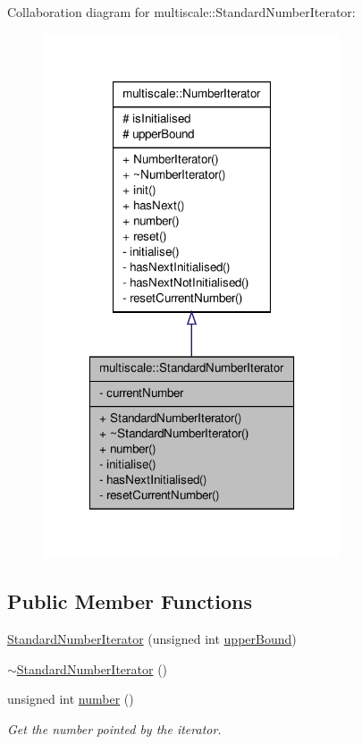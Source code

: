\-Collaboration diagram for multiscale\-:\-:\-Standard\-Number\-Iterator\-:
\nopagebreak
\begin{figure}[H]
\begin{center}
\leavevmode
\includegraphics[width=250pt]{classmultiscale_1_1StandardNumberIterator__coll__graph}
\end{center}
\end{figure}
\subsection*{\-Public \-Member \-Functions}
\begin{DoxyCompactItemize}
\item 
\hyperlink{classmultiscale_1_1StandardNumberIterator_a43b7b42ae0ed44a140cf4817cadf9166}{\-Standard\-Number\-Iterator} (unsigned int \hyperlink{classmultiscale_1_1NumberIterator_a56a5558958778bbde64e249d67cba886}{upper\-Bound})
\item 
\hyperlink{classmultiscale_1_1StandardNumberIterator_aa5b9da824bd014eebab86462f7d08219}{$\sim$\-Standard\-Number\-Iterator} ()
\item 
unsigned int \hyperlink{classmultiscale_1_1StandardNumberIterator_a9071fcd0f94b3520a76ed22faed97353}{number} ()
\begin{DoxyCompactList}\small\item\em \-Get the number pointed by the iterator. \end{DoxyCompactList}\end{DoxyCompactItemize}
